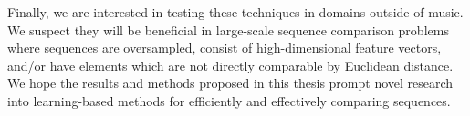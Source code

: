 Finally, we are interested in testing these techniques in domains outside of music.
We suspect they will be beneficial in large-scale sequence comparison problems where sequences are oversampled, consist of high-dimensional feature vectors, and/or have elements which are not directly comparable by Euclidean distance.
We hope the results and methods proposed in this thesis prompt novel research into learning-based methods for efficiently and effectively comparing sequences.
